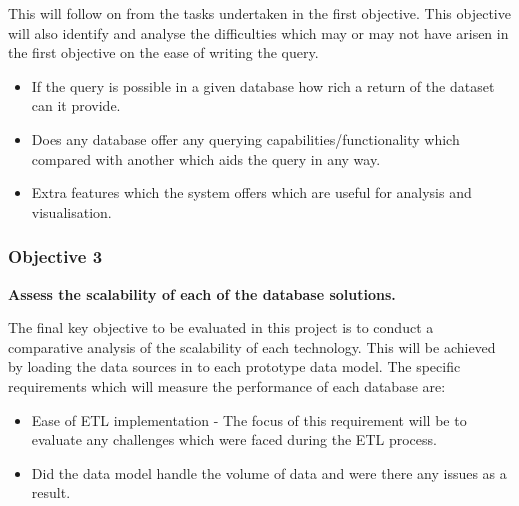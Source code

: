 This will follow on from the tasks undertaken in the first objective. This objective will also identify and analyse the difficulties which may or may not have arisen in the first objective on the ease of writing the query.

\begin{itemize}
\item If the query is possible in a given database how rich a return of the dataset can it provide.
\item Does any database offer any querying capabilities/functionality which compared with another which aids the query in any way.
\item Extra features which the system offers which are useful for analysis and visualisation.
\end{itemize}

\subsubsection*{Objective 3}
\textbf{Assess the scalability of each of the database solutions.}

The final key objective to be evaluated in this project is to conduct a comparative analysis of the scalability of each technology. This will be achieved by loading the data sources in to each prototype data model. The specific requirements which will measure the performance of each database are:

\begin{itemize}
\item Ease of ETL implementation - The focus of this requirement will be to evaluate any challenges which were faced during the ETL process.
\item Did the data model handle the volume of data and were there any issues as a result.
\end{itemize}

